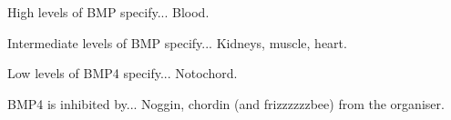 \begin{flashcard}{High levels of BMP specify...}
Blood.
\end{flashcard}

\begin{flashcard}{Intermediate levels of BMP specify...}
Kidneys, muscle, heart.
\end{flashcard}

\begin{flashcard}{Low levels of BMP4 specify...}
Notochord.
\end{flashcard}

\begin{flashcard}{BMP4 is inhibited by...}
Noggin, chordin (and frizzzzzzbee) from the organiser.
\end{flashcard}
